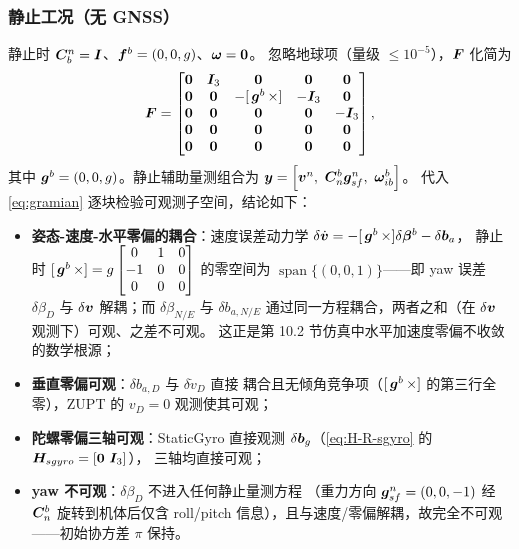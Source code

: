 \subsubsection{静止工况（无 GNSS）}

静止时 $\boldsymbol{C}_b^n = \boldsymbol{I}$、$\boldsymbol{f}^b = (0,0,g)$、$\boldsymbol{\omega} = \boldsymbol{0}$。
忽略地球项（量级 $\le 10^{-5}$），$\boldsymbol{F}$ 化简为
\begin{equation}
  \boldsymbol{F} = \begin{bmatrix}
    \boldsymbol{0} & \boldsymbol{I}_3 & \boldsymbol{0} & \boldsymbol{0} & \boldsymbol{0} \\
    \boldsymbol{0} & \boldsymbol{0} & -[\,\boldsymbol{g}^b\,\times] & -\boldsymbol{I}_3 & \boldsymbol{0} \\
    \boldsymbol{0} & \boldsymbol{0} & \boldsymbol{0} & \boldsymbol{0} & -\boldsymbol{I}_3 \\
    \boldsymbol{0} & \boldsymbol{0} & \boldsymbol{0} & \boldsymbol{0} & \boldsymbol{0} \\
    \boldsymbol{0} & \boldsymbol{0} & \boldsymbol{0} & \boldsymbol{0} & \boldsymbol{0}
  \end{bmatrix},
  \label{eq:F-static}
\end{equation}
其中 $\boldsymbol{g}^b = (0,0,g)$。静止辅助量测组合为
$\vp{y} = \left[\vp{v}^n,\ \m{C}_n^b\vp{g}_{sf}^n,\ \vp{\omega}_{ib}^b\right]$。
代入 \cref{eq:gramian} 逐块检验可观测子空间，结论如下：
\begin{itemize}
  \item \textbf{姿态-速度-水平零偏的耦合}：速度误差动力学
    $\delta\dot{\boldsymbol{v}} = -[\,\boldsymbol{g}^b\,\times]\delta\boldsymbol{\beta}^b - \delta\boldsymbol{b}_a$，
    静止时 $[\,\boldsymbol{g}^b\,\times] = g\begin{bmatrix} 0&1&0 \\ -1&0&0 \\ 0&0&0 \end{bmatrix}$
    的零空间为 $\operatorname{span}\{(0,0,1)\}$——即 yaw 误差 $\delta\beta_D$
    与 $\delta\boldsymbol{v}$ 解耦；而 $\delta\beta_{N/E}$ 与 $\delta b_{a,N/E}$
    通过同一方程耦合，两者之和（在 $\delta\boldsymbol{v}$ 观测下）可观、之差不可观。
    这正是第 10.2 节仿真中水平加速度零偏不收敛的数学根源；
  \item \textbf{垂直零偏可观}：$\delta b_{a,D}$ 与 $\delta\dot{v}_D$ 直接
    耦合且无倾角竞争项（$[\,\boldsymbol{g}^b\,\times]$ 的第三行全零），ZUPT 的
    $v_D = 0$ 观测使其可观；
  \item \textbf{陀螺零偏三轴可观}：StaticGyro 直接观测
    $\delta\boldsymbol{b}_g$（\cref{eq:H-R-sgyro} 的 $\boldsymbol{H}_{sgyro} = [\boldsymbol{0}\ \boldsymbol{I}_3]$），
    三轴均直接可观；
  \item \textbf{yaw 不可观}：$\delta\beta_D$ 不进入任何静止量测方程
    （重力方向 $\boldsymbol{g}_{sf}^n = (0,0,-1)$ 经 $\boldsymbol{C}_n^b$ 旋转到机体后仅含
    roll/pitch 信息），且与速度/零偏解耦，故完全不可观——初始协方差
    $\pi$ 保持。
\end{itemize}


